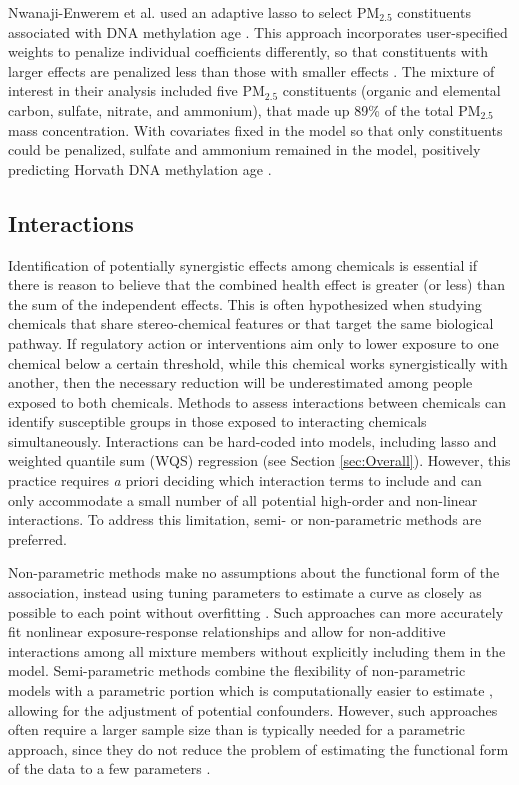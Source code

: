 Nwanaji-Enwerem et al. used an adaptive lasso to select PM$_{2.5}$ constituents associated with DNA methylation age \citep{nwanaji2017associations}. This approach incorporates user-specified weights to penalize individual coefficients differently, so that constituents with larger effects are penalized less than those with smaller effects \citep{zou2006adaptive}. The mixture of interest in their analysis included five PM$_{2.5}$ constituents (organic and elemental carbon, sulfate, nitrate, and ammonium), that made up 89\% of the total PM$_{2.5}$ mass concentration. With covariates fixed in the model so that only constituents could be penalized, sulfate and ammonium remained in the model, positively predicting Horvath DNA methylation age \citep{nwanaji2017associations}.

\subsection{Interactions}\label{sec:Interact}

Identification of potentially synergistic effects among chemicals is essential if there is reason to believe that the combined health effect is greater (or less) than the sum of the independent effects. This is often hypothesized when studying chemicals that share stereo-chemical features or that target the same biological pathway. If regulatory action or interventions aim only to lower exposure to one chemical below a certain threshold, while this chemical works synergistically with another, then the necessary reduction will be underestimated among people exposed to both chemicals. Methods to assess interactions between chemicals can identify susceptible groups in those exposed to interacting chemicals simultaneously. Interactions can be hard-coded into models, including lasso and weighted quantile sum (WQS) regression (see Section \ref{sec:Overall}). However, this practice requires {\textit a priori} deciding which interaction terms to include and can only accommodate a small number of all potential high-order and non-linear interactions. To address this limitation, semi- or non-parametric methods are preferred.

Non-parametric methods make no assumptions about the functional form of the association, instead using tuning parameters to estimate a curve as closely as possible to each point without overfitting \citep{ISLR}. Such approaches can more accurately fit nonlinear exposure-response relationships and allow for non-additive interactions among all mixture members without explicitly including them in the model. Semi-parametric methods combine the flexibility of non-parametric models with a parametric portion which is computationally easier to estimate \citep{friedman2001elements}, allowing for the adjustment of potential confounders. However, such approaches often require a larger sample size than is typically needed for a parametric approach, since they do not reduce the problem of estimating the functional form of the data to a few parameters \citep{ISLR}.

